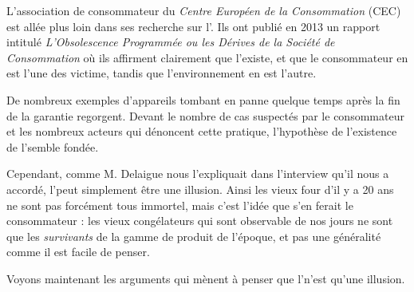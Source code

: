 L'association de consommateur du \textit{Centre Européen de la Consommation} (CEC) est allée plus loin dans ses recherche sur l'\op. Ils ont publié en 2013 un rapport intitulé \textit{L'Obsolescence Programmée ou les Dérives de la Société de Consommation} où ils affirment clairement que l'\op existe, et que le consommateur en est l'une des victime, tandis que l'environnement en est l'autre. 

\medbreak

De nombreux exemples d'appareils tombant en panne quelque temps après la fin de la garantie regorgent. Devant le nombre de cas suspectés par le consommateur et les nombreux acteurs qui dénoncent cette pratique, l'hypothèse de l'existence de l'\op semble fondée. 

\bigbreak
Cependant, comme M. Delaigue nous l'expliquait dans l'interview qu'il nous a accordé, l'\op peut simplement être une illusion. Ainsi les vieux four d'il y a 20 ans ne sont pas forcément tous immortel, mais c'est l'idée que s'en ferait le consommateur : les vieux congélateurs qui sont observable de nos jours ne sont que les \textit{survivants } de la gamme de produit de l'époque, et pas une généralité comme il est facile de penser. 


Voyons maintenant les arguments qui mènent à penser que l'\op n'est qu'une illusion. 
